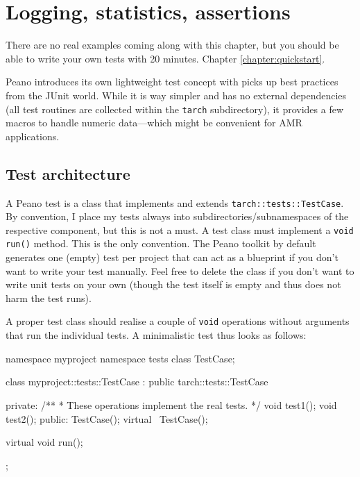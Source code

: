 \section{Logging, statistics, assertions}
\label{section:logging}



\chapterDescription
  {
    There are no real examples coming along with this chapter, but you should be
    able to write your own tests with 20 minutes.
  }
  {
    Chapter \ref{chapter:quickstart}.
  }

Peano introduces its own lightweight test concept with picks up best practices
from the JUnit world. 
While it is way simpler and has no external dependencies (all test routines are
collected within the \texttt{tarch} subdirectory), it provides a few macros to
handle numeric data---which might be convenient for AMR applications.

\subsection{Test architecture}

A Peano test is a class that implements and extends
\texttt{tarch::tests::TestCase}.
By convention, I place my tests always into subdirectories/subnamespaces of the
respective component, but this is not a must.
A test class must implement a \texttt{void run()} method.
This is the only convention. 
The Peano toolkit by default generates one (empty) test per project that can act
as a blueprint if you don't want to write your test manually. 
Feel free to delete the class if you don't want to write unit tests on your own
(though the test itself is empty and thus does not harm the test runs).

A proper test class should realise a couple of \texttt{void} operations without
arguments that run the individual tests.
A minimalistic test thus looks as follows:

\begin{code}
namespace myproject {
  namespace tests {
    class TestCase;
  }
}

class myproject::tests::TestCase : public tarch::tests::TestCase {
 private:
  /**
   * These operations implement the real tests.
   */
  void test1();
  void test2();
 public:
  TestCase();
  virtual ~TestCase();

  virtual void run();
};
\end{code}

